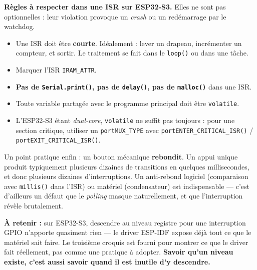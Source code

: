 \begin{imp}
\textbf{Règles à respecter dans une ISR sur ESP32-S3.} Elles ne sont pas optionnelles : leur violation provoque un \textit{crash} ou un redémarrage par le watchdog.
\begin{itemize}
    \item Une ISR doit être \textbf{courte}. Idéalement : lever un drapeau, incrémenter un compteur, et sortir. Le traitement se fait dans le \texttt{loop()} ou dans une tâche.
    \item Marquer l'ISR \texttt{IRAM\_ATTR}.
    \item \textbf{Pas de \texttt{Serial.print()}, pas de \texttt{delay()}, pas de \texttt{malloc()}} dans une ISR.
    \item Toute variable partagée avec le programme principal doit être \texttt{volatile}.
    \item L'ESP32-S3 étant \textit{dual-core}, \texttt{volatile} ne suffit pas toujours : pour une section critique, utiliser un \texttt{portMUX\_TYPE} avec \texttt{portENTER\_CRITICAL\_ISR()} / \texttt{portEXIT\_CRITICAL\_ISR()}.
\end{itemize}
\end{imp}

Un point pratique enfin : un bouton mécanique \textbf{rebondit}. Un appui unique produit typiquement plusieurs dizaines de transitions en quelques millisecondes, et donc plusieurs dizaines d'interruptions. Un anti-rebond logiciel (comparaison avec \texttt{millis()} dans l'ISR) ou matériel (condensateur) est indispensable — c'est d'ailleurs un défaut que le \textit{polling} masque naturellement, et que l'interruption révèle brutalement.


\begin{imp}
\textbf{À retenir :} sur ESP32-S3, descendre au niveau registre pour une interruption GPIO n'apporte quasiment rien — le driver ESP-IDF expose déjà tout ce que le matériel sait faire. Le troisième croquis est fourni pour montrer ce que le driver fait réellement, pas comme une pratique à adopter. \textbf{Savoir qu'un niveau existe, c'est aussi savoir quand il est inutile d'y descendre.}
\end{imp}

